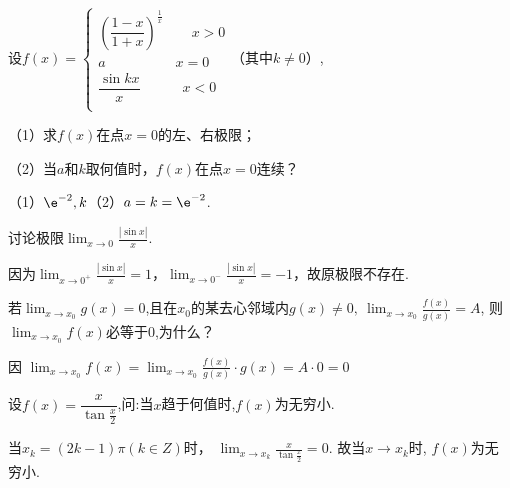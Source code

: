 \begin{problem}
	设$f(x) =  \begin{cases} 
\left( \dfrac{1 - x}{1 + x} \right)^{\frac{1}{x}}\quad\quad x > 0 \\
a\quad\quad\quad\quad\mspace{6mu}\mspace{6mu}\mspace{6mu} x = 0 \\
\dfrac{\sin kx}{x}\quad\quad\quad x < 0 \\
\end{cases} $（其中$k \neq 0$）, 

（1）求$f(x)$在点$x = 0$的左、右极限；

（2）当$a$和$k$取何值时，$f(x)$在点$x = 0$连续？

\begin{solution} 
	（1）$\e^{- 2}, k$（2）$a = k = \e^{- 2}$.
\end{solution}


\end{problem}



\begin{problem}讨论极限$\displaystyle \lim_{x \rightarrow 0}\frac{|\sin x|}{x}$.
	
	\begin{solution}
		因为$\displaystyle \lim_{x \rightarrow 0^{+}}\frac{|\sin x|}{x} = 1$，$\displaystyle \lim_{x \rightarrow 0^{-}}\frac{|\sin x|}{x} = - 1$，故原极限不存在.
		
	\end{solution}

\end{problem}           


\begin{problem}若$\displaystyle \lim_{x \rightarrow x_{0}}g(x) = 0$,且在$x_{0}$的某去心邻域内$g(x) \neq 0,\ \displaystyle \lim_{x \rightarrow x_{0}}\frac{f(x)}{g(x)} = A$, 则$\displaystyle \lim_{x \rightarrow x_{0}}f(x)$必等于$0$,为什么？
	
	\begin{solution} 
		因 $\displaystyle \lim_{x \rightarrow x_{0}}f(x) = \lim_{x \rightarrow x_{0}}\frac{f(x)}{g(x)} \cdot g(x) = A \cdot 0 = 0$
		
	\end{solution}
\end{problem}           


\begin{problem}设$f(x) = \dfrac{x}{\tan\frac{x}{2}}$,问:当$x$趋于何值时,$f(x)$为无穷小.
	
	\begin{solution}
		当$x_{k}=(2 k-1) \pi (k \in Z) $时，
		$\displaystyle  \lim _{x \rightarrow x_{k}} \frac{x}{\tan \frac{x}{2}}=0 $. 故当$x \rightarrow x_{k}$时, $f(x)$为无穷小.
		
	\end{solution}


\end{problem}           


